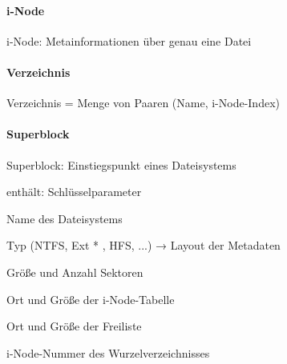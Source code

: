 \documentclass[a4pape]{article}
\begin{document}
\begin{multicols}{3}
  \paragraph{i-Node}
  i-Node: Metainformationen über genau eine Datei

  \paragraph{Verzeichnis}
  Verzeichnis = Menge von Paaren (Name, i-Node-Index)

  \paragraph{Superblock}
  \begin{itemize*}
    \item Superblock: Einstiegspunkt eines Dateisystems
    \item enthält: Schlüsselparameter
    \begin{itemize*}
      \item Name des Dateisystems
      \item Typ (NTFS, Ext * , HFS, ...) → Layout der Metadaten
      \item Größe und Anzahl Sektoren
      \item Ort und Größe der i-Node-Tabelle
      \item Ort und Größe der Freiliste
      \item i-Node-Nummer des Wurzelverzeichnisses
    \end{itemize*}
  \end{itemize*}


\end{multicols}
\end{document}
